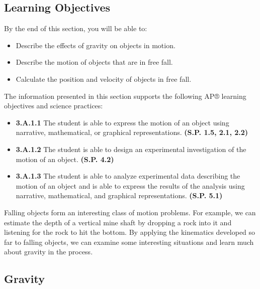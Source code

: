 \documentclass[
]{book}
\providecommand{\tightlist}{%
  \setlength{\itemsep}{0pt}\setlength{\parskip}{0pt}}
\newenvironment{learning-objectives}{}{}
\begin{document}
\hypertarget{fs-id3275688}{}
\begin{learning-objectives}

\hypertarget{learning-objectives-5}{%
\subsection{Learning Objectives}\label{learning-objectives-5}}

By the end of this section, you will be able to:

\begin{itemize}
\tightlist
\item
  Describe the effects of gravity on objects in motion.
\item
  Describe the motion of objects that are in free fall.
\item
  Calculate the position and velocity of objects in free fall.
\end{itemize}

The information presented in this section supports the following AP®
learning objectives and science practices:

\begin{itemize}
\tightlist
\item
  \textbf{3.A.1.1} The student is able to express the motion of an object
  using narrative, mathematical, or graphical representations. \textbf{(S.P.
  1.5, 2.1, 2.2)}
\item
  \textbf{3.A.1.2} The student is able to design an experimental
  investigation of the motion of an object. \textbf{(S.P. 4.2)}
\item
  \textbf{3.A.1.3} The student is able to analyze experimental data
  describing the motion of an object and is able to express the
  results of the analysis using narrative, mathematical, and graphical
  representations. \textbf{(S.P. 5.1)}
\end{itemize}

\end{learning-objectives}

Falling objects form an interesting class of motion problems. For
example, we can estimate the depth of a vertical mine shaft by dropping
a rock into it and listening for the rock to hit the bottom. By applying
the kinematics developed so far to falling objects, we can examine some
interesting situations and learn much about gravity in the process.

\hypertarget{fs-id4178141}{}
\hypertarget{gravity}{%
\subsection{Gravity}\label{gravity}}
\end{document}
